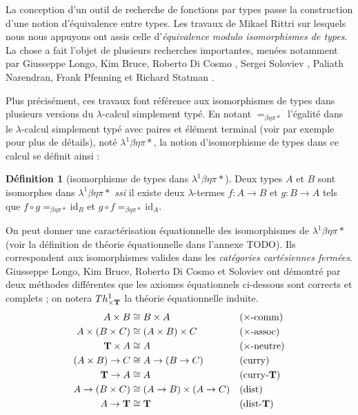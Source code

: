 \documentclass [a4paper] {report}
\theoremstyle {definition}
\newtheorem {definition} {Définition} [section]
\newcommand {\ssi} {\textit {ssi}\xspace}
\begin{document}
La conception d'un outil de recherche de fonctions par types passe la construction d'une notion d'équivalence entre types. Les travaux de Mikael Rittri \cite {rittri91, rittri93} sur lesquels nous nous appuyons ont assis celle d'\emph{équivalence modulo isomorphismes de types}. La chose a fait l'objet de plusieurs recherches importantes, menées notamment par Giusseppe Longo, Kim Bruce, Roberto Di Cosmo \cite {bruce_dicosmo_longo, dicosmo92, dicosmo93, dicosmo95}, Sergei Soloviev \cite {soloviev83, soloviev93}, Paliath Narendran, Frank Pfenning et Richard Statman \cite {narendran_pfenning_statman}.

Plus précisément, ces travaux font référence aux isomorphismes de types dans plusieurs versions du $\lambda$-calcul simplement typé. En notant $=_{\beta \eta \pi *}$ l'égalité dans le $\lambda$-calcul simplement typé avec paires et élément terminal (voir par exemple \cite {dicosmo95} pour plus de détails), noté $\lambda^1 \beta \eta \pi *$, la notion d'isomorphisme de types dans ce calcul se définit ainsi :

\begin {definition} [isomorphisme de types dans $\lambda^1 \beta \eta \pi *$]
	Deux types $A$ et $B$ sont isomorphes dans $\lambda^1 \beta \eta \pi *$ \ssi il existe deux $\lambda$-termes $f : A \rightarrow B$ et $g : B \rightarrow A$ tels que $f \circ g =_{\beta \eta \pi *} \mathrm {id} _B$ et $g \circ f =_{\beta \eta \pi *} \mathrm {id} _A$.
\end {definition}

On peut donner une caractérisation équationnelle des isomorphismes de $\lambda^1 \beta \eta \pi *$ (voir la définition de théorie équationnelle dans l'annexe TODO). Ils correspondent aux isomorphismes valides dans les \emph {catégories cartésiennes fermées}. Giusseppe Longo, Kim Bruce, Roberto Di Cosmo \cite {bruce_dicosmo_longo} et Soloviev \cite {soloviev83} ont démontré par deux méthodes différentes que les axiomes équationnels ci-dessous sont corrects et complets ; on notera $Th^1 _{\times \bold T}$ la théorie équationnelle induite.
\begin {align*}
		A \times B &\cong
		B \times A &&
		\text {($\times$-comm)}
	\\
		A \times (B \times C) &\cong
		(A \times B) \times C &&
		\text {($\times$-assoc)}
	\\
		\bold T \times A &\cong
		A &&
		\text {($\times$-neutre)}
	\\
		(A \times B) \rightarrow C &\cong
		A \rightarrow (B \rightarrow C) &&
		\text {(curry)}
	\\
		\bold T \rightarrow A &\cong
		A &&
		\text {(curry-$\bold T$)}
	\\
		A \rightarrow (B \times C) &\cong
		(A \rightarrow B) \times (A \rightarrow C) &&
		\text {(dist)}
	\\
		A \rightarrow \bold T &\cong
		\bold T &&
		\text {(dist-$\bold T$)}
\end {align*}
\end{document}
